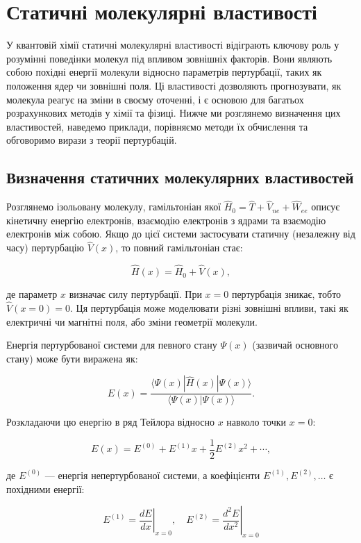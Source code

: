 \documentclass{PySCFBook}
\begin{document}
\section{Статичні молекулярні властивості}

У квантовій хімії статичні молекулярні властивості відіграють ключову роль у розумінні поведінки молекул під впливом зовнішніх факторів. Вони являють собою похідні енергії молекули відносно параметрів пертурбації, таких як положення ядер чи зовнішні поля. Ці властивості дозволяють прогнозувати, як молекула реагує на зміни в своєму оточенні, і є основою для багатьох розрахункових методів у хімії та фізиці. Нижче ми розглянемо визначення цих властивостей, наведемо приклади, порівняємо методи їх обчислення та обговоримо вирази з теорії пертурбацій.

\subsection{Визначення статичних молекулярних властивостей}

Розглянемо ізольовану молекулу, гамільтоніан якої \(\hat{H}_0 = \hat{T} + \hat{V}_{ne} + \hat{W}_{ee}\) описує кінетичну енергію електронів, взаємодію електронів з ядрами та взаємодію електронів між собою. Якщо до цієї системи застосувати статичну (незалежну від часу) пертурбацію \(\hat{V}(x)\), то повний гамільтоніан стає:

\[
\hat{H}(x) = \hat{H}_0 + \hat{V}(x),
\]

де параметр \(x\) визначає силу пертурбації. При \(x = 0\) пертурбація зникає, тобто \(\hat{V}(x = 0) = 0\). Ця пертурбація може моделювати різні зовнішні впливи, такі як електричні чи магнітні поля, або зміни геометрії молекули.

Енергія пертурбованої системи для певного стану \(\Psi(x)\) (зазвичай основного стану) може бути виражена як:

\[
E(x) = \frac{\langle \Psi(x) | \hat{H}(x) | \Psi(x) \rangle}{\langle \Psi(x) | \Psi(x) \rangle}.
\]

Розкладаючи цю енергію в ряд Тейлора відносно \(x\) навколо точки \(x = 0\):

\[
E(x) = E^{(0)} + E^{(1)} x + \frac{1}{2} E^{(2)} x^2 + \cdots,
\]

де \(E^{(0)}\) — енергія непертурбованої системи, а коефіцієнти \(E^{(1)}, E^{(2)}, \ldots\) є похідними енергії:

\[
E^{(1)} = \left. \frac{dE}{dx} \right|_{x=0}, \quad E^{(2)} = \left. \frac{d^2 E}{dx^2} \right|_{x=0}
\]
\end{document}
